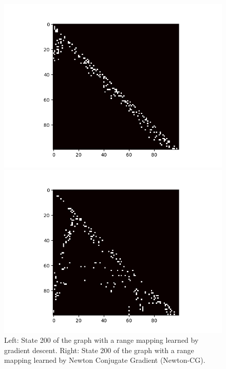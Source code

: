 \begin{figure}
    \begin{minipage}{0.49\textwidth}
        \begin{center}
            \includegraphics[scale=0.5]{figures/sgd_adj_100.png}
        \end{center}
    \end{minipage}
    \begin{minipage}{0.49\textwidth}
        \begin{center}
            \includegraphics[scale=0.5]{figures/cgnewton-matrix.png}
        \end{center}
    \end{minipage}
	\caption{
        Left: State 200 of the graph with a range mapping learned by gradient descent.
        Right: State 200 of the graph with a range mapping learned by Newton Conjugate Gradient (Newton-CG).
	}
    \label{fig:newton-accuracy}
\end{figure}

